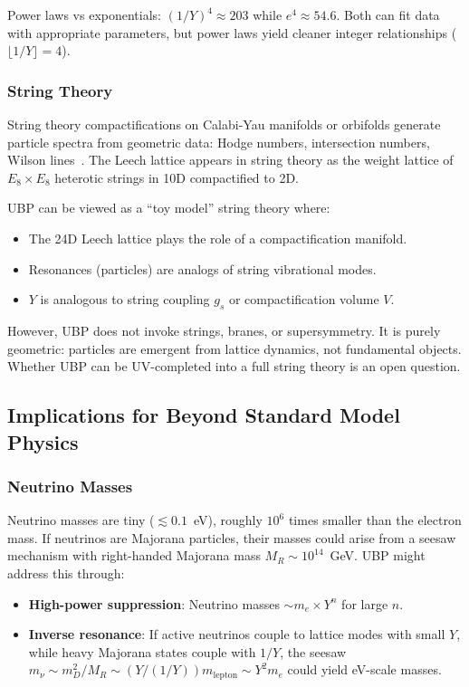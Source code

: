 \documentclass[11pt,a4paper]{article}
\begin{document}
Power laws vs exponentials: $(1/Y)^4 \approx 203$ while $e^4 \approx 54.6$. Both can fit data with appropriate parameters, but power laws yield cleaner integer relationships ($\lfloor 1/Y \rfloor = 4$).

\subsubsection{String Theory}

String theory compactifications on Calabi-Yau manifolds or orbifolds generate particle spectra from geometric data: Hodge numbers, intersection numbers, Wilson lines~\cite{ref013}. The Leech lattice appears in string theory as the weight lattice of $E_8 \times E_8$ heterotic strings in 10D compactified to 2D.

UBP can be viewed as a ``toy model'' string theory where:
\begin{itemize}
\item The 24D Leech lattice plays the role of a compactification manifold.
\item Resonances (particles) are analogs of string vibrational modes.
\item $Y$ is analogous to string coupling $g_s$ or compactification volume $V$.
\end{itemize}

However, UBP does not invoke strings, branes, or supersymmetry. It is purely geometric: particles are emergent from lattice dynamics, not fundamental objects. Whether UBP can be UV-completed into a full string theory is an open question.

\subsection{Implications for Beyond Standard Model Physics}

\subsubsection{Neutrino Masses}

Neutrino masses are tiny ($\lesssim 0.1$~eV), roughly $10^6$ times smaller than the electron mass. If neutrinos are Majorana particles, their masses could arise from a seesaw mechanism with right-handed Majorana mass $M_R \sim 10^{14}$~GeV. UBP might address this through:
\begin{itemize}
\item \textbf{High-power suppression}: Neutrino masses $\sim m_e \times Y^n$ for large $n$.
\item \textbf{Inverse resonance}: If active neutrinos couple to lattice modes with small $Y$, while heavy Majorana states couple with $1/Y$, the seesaw $m_\nu \sim m_D^2 / M_R \sim (Y / (1/Y)) m_{\text{lepton}} \sim Y^2 m_e$ could yield eV-scale masses.
\end{itemize}
\end{document}
